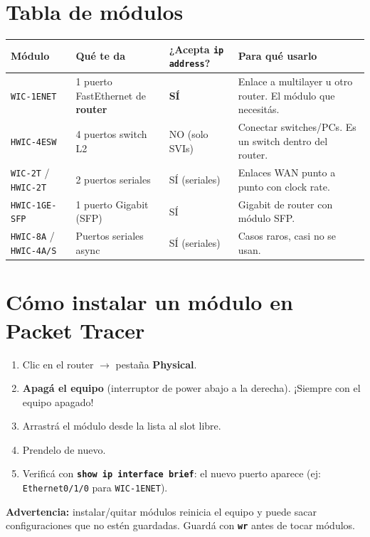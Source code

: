 \documentclass[11pt,a4paper]{report}
\newcommand{\cmd}[1]{\texttt{\textbf{#1}}}
\begin{document}
\section{Tabla de módulos}

\begin{longtable}{@{}p{3.5cm}p{5.5cm}p{3.5cm}p{3cm}@{}}
\toprule
\textbf{Módulo} & \textbf{Qué te da} & \textbf{¿Acepta \cmd{ip address}?} & \textbf{Para qué usarlo} \\
\midrule
\endhead
\texttt{WIC-1ENET} & 1 puerto FastEthernet de \textbf{router} & \textbf{SÍ} & Enlace a multilayer u otro router. El módulo que necesitás. \\
\addlinespace
\texttt{HWIC-4ESW} & 4 puertos switch L2 & NO (solo SVIs) & Conectar switches/PCs. Es un switch dentro del router. \\
\addlinespace
\texttt{WIC-2T} / \texttt{HWIC-2T} & 2 puertos seriales & SÍ (seriales) & Enlaces WAN punto a punto con clock rate. \\
\addlinespace
\texttt{HWIC-1GE-SFP} & 1 puerto Gigabit (SFP) & SÍ & Gigabit de router con módulo SFP. \\
\addlinespace
\texttt{HWIC-8A} / \texttt{HWIC-4A/S} & Puertos seriales async & SÍ (seriales) & Casos raros, casi no se usan. \\
\bottomrule
\end{longtable}

\section{Cómo instalar un módulo en Packet Tracer}

\begin{enumerate}
  \item Clic en el router $\rightarrow$ pestaña \textbf{Physical}.
  \item \textbf{Apagá el equipo} (interruptor de power abajo a la derecha). ¡Siempre con el equipo apagado!
  \item Arrastrá el módulo desde la lista al slot libre.
  \item Prendelo de nuevo.
  \item Verificá con \cmd{show ip interface brief}: el nuevo puerto aparece (ej: \texttt{Ethernet0/1/0} para \texttt{WIC-1ENET}).
\end{enumerate}

\textbf{Advertencia:} instalar/quitar módulos reinicia el equipo y puede sacar configuraciones que no estén guardadas. Guardá con \cmd{wr} antes de tocar módulos.
\end{document}

